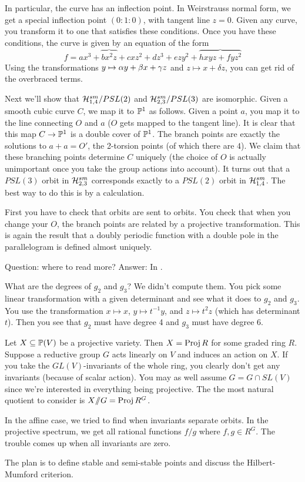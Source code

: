 In particular, the curve has an inflection point. In Weirstrauss normal form, we get a special inflection point $(0:1:0)$, with tangent line $z=0$. Given any curve, you transform it to one that satisfies these conditions. Once you have these conditions, the curve is given by an equation of the form
\[
 f=ax^3+\overbrace{bx^2z}+cxz^2+dz^3+ezy^2+\overbrace{hxyz+fyz^2}
\]
Using the transformations $y\mapsto \alpha y+\beta x+\gamma z$ and $z\mapsto x+\delta z$, you can get rid of the overbraced terms.

Next we'll show that $\mathcal{H}_{1,4}^{sm}/PSL(2)$ and $\mathcal{H}_{2,3}^{sm}/PSL(3)$ are isomorphic. Given a smooth cubic curve $C$, we map it to $\mathbb{P}^1$ as follows. Given a point $a$, you map it to the line connecting $O$ and $a$ ($O$ gets mapped to the tangent line). It is clear that this map $C\to \mathbb{P}^1$ is a double cover of $\mathbb{P}^1$. The branch points are exactly the solutions to $a+a=O'$, the 2-torsion points (of which there are $4$). We claim that these branching points determine $C$ uniquely (the choice of $O$ is actually unimportant once you take the group actions into account). It turns out that a $PSL(3)$ orbit in $\mathcal{H}^{sm}_{2,3}$ corresponds exactly to a $PSL(2)$ orbit in $\mathcal{H}^{sm}_{1,4}$. The best way to do this is by a calculation.

First you have to check that orbits are sent to orbits. You check that when you change your $O$, the branch points are related by a projective transformation. This is again the result that a doubly periodic function with a double pole in the parallelogram is defined almost uniquely.


Question: where to read more? Answer: In \cite{mukai}.

What are the degrees of $g_2$ and $g_3$? We didn't compute them. You pick some linear transformation with a given determinant and see what it does to $g_2$ and $g_3$. You use the transformation $x\mapsto x$, $y\mapsto t^{-1}y$, and $z\mapsto t^2z$ (which has determinant $t$). Then you see that $g_2$ must have degree 4 and $g_3$ must have degree 6.


Let $X\subseteq \mathbb{P}(V)$ be a projective variety. Then $X=\operatorname{Proj} R$ for some graded ring $R$. Suppose a reductive group $G$ acts linearly on $V$ and induces an action on $X$. If you take the $GL(V)$-invariants of the whole ring, you clearly don't get any invariants (because of scalar action). You may as well assume $G=G\cap SL(V)$ since we're interested in everything being projective. The the most natural quotient to consider is $X\mbox{\rm /\!\!/} G=\operatorname{Proj} R^G$.

In the affine case, we tried to find when invariants separate orbits. In the projective spectrum, we get all rational functions $f/g$ where $f,g\in R^G$. The trouble comes up when all invariants are zero.

The plan is to define stable and semi-stable points and discuss the Hilbert-Mumford criterion.